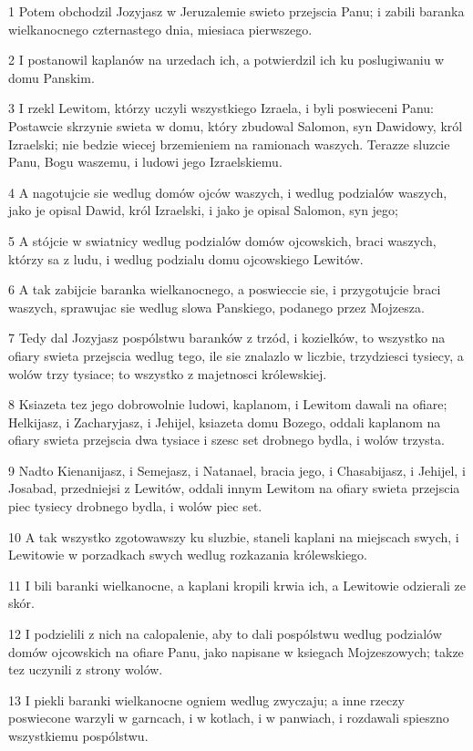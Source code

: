 \par 1 Potem obchodzil Jozyjasz w Jeruzalemie swieto przejscia Panu; i zabili baranka wielkanocnego czternastego dnia, miesiaca pierwszego.
\par 2 I postanowil kaplanów na urzedach ich, a potwierdzil ich ku poslugiwaniu w domu Panskim.
\par 3 I rzekl Lewitom, którzy uczyli wszystkiego Izraela, i byli poswieceni Panu: Postawcie skrzynie swieta w domu, który zbudowal Salomon, syn Dawidowy, król Izraelski; nie bedzie wiecej brzemieniem na ramionach waszych. Terazze sluzcie Panu, Bogu waszemu, i ludowi jego Izraelskiemu.
\par 4 A nagotujcie sie wedlug domów ojców waszych, i wedlug podzialów waszych, jako je opisal Dawid, król Izraelski, i jako je opisal Salomon, syn jego;
\par 5 A stójcie w swiatnicy wedlug podzialów domów ojcowskich, braci waszych, którzy sa z ludu, i wedlug podzialu domu ojcowskiego Lewitów.
\par 6 A tak zabijcie baranka wielkanocnego, a poswieccie sie, i przygotujcie braci waszych, sprawujac sie wedlug slowa Panskiego, podanego przez Mojzesza.
\par 7 Tedy dal Jozyjasz pospólstwu baranków z trzód, i kozielków, to wszystko na ofiary swieta przejscia wedlug tego, ile sie znalazlo w liczbie, trzydziesci tysiecy, a wolów trzy tysiace; to wszystko z majetnosci królewskiej.
\par 8 Ksiazeta tez jego dobrowolnie ludowi, kaplanom, i Lewitom dawali na ofiare; Helkijasz, i Zacharyjasz, i Jehijel, ksiazeta domu Bozego, oddali kaplanom na ofiary swieta przejscia dwa tysiace i szesc set drobnego bydla, i wolów trzysta.
\par 9 Nadto Kienanijasz, i Semejasz, i Natanael, bracia jego, i Chasabijasz, i Jehijel, i Josabad, przedniejsi z Lewitów, oddali innym Lewitom na ofiary swieta przejscia piec tysiecy drobnego bydla, i wolów piec set.
\par 10 A tak wszystko zgotowawszy ku sluzbie, staneli kaplani na miejscach swych, i Lewitowie w porzadkach swych wedlug rozkazania królewskiego.
\par 11 I bili baranki wielkanocne, a kaplani kropili krwia ich, a Lewitowie odzierali ze skór.
\par 12 I podzielili z nich na calopalenie, aby to dali pospólstwu wedlug podzialów domów ojcowskich na ofiare Panu, jako napisane w ksiegach Mojzeszowych; takze tez uczynili z strony wolów.
\par 13 I piekli baranki wielkanocne ogniem wedlug zwyczaju; a inne rzeczy poswiecone warzyli w garncach, i w kotlach, i w panwiach, i rozdawali spieszno wszystkiemu pospólstwu.
